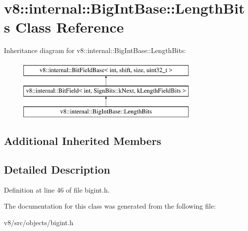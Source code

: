 \hypertarget{classv8_1_1internal_1_1BigIntBase_1_1LengthBits}{}\section{v8\+:\+:internal\+:\+:Big\+Int\+Base\+:\+:Length\+Bits Class Reference}
\label{classv8_1_1internal_1_1BigIntBase_1_1LengthBits}
Inheritance diagram for v8\+:\+:internal\+:\+:Big\+Int\+Base\+:\+:Length\+Bits\+:\begin{figure}[H]
\begin{center}
\leavevmode
\includegraphics[height=3.000000cm]{classv8_1_1internal_1_1BigIntBase_1_1LengthBits}
\end{center}
\end{figure}
\subsection*{Additional Inherited Members}


\subsection{Detailed Description}


Definition at line 46 of file bigint.\+h.



The documentation for this class was generated from the following file\+:\begin{DoxyCompactItemize}
\item 
v8/src/objects/bigint.\+h\end{DoxyCompactItemize}
